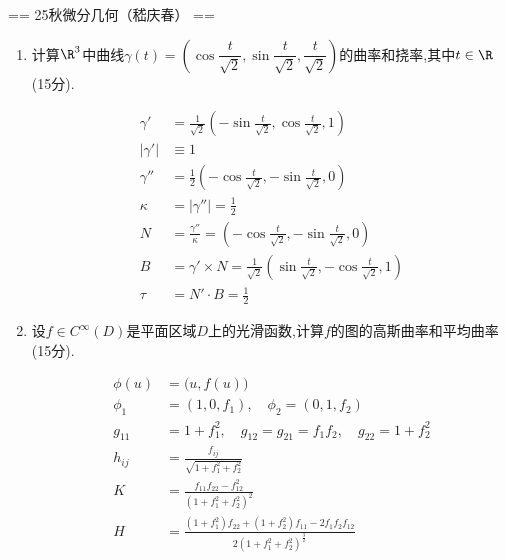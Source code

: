 \newcommand{\d}{\mathrm{d}}


== 25秋微分几何（嵇庆春） ==

	\begin{enumerate}
		\item 计算$\R^{3}$中曲线$\gamma(t)=\left(\cos\dfrac{t}{\sqrt{2}},\sin\dfrac{t}{\sqrt{2}},\dfrac{t}{\sqrt{2}}\right)$的曲率和挠率,其中$t\in\R$(15分).
        \begin{proofc}
            \begin{align*}
				\gamma'&=\frac{1}{\sqrt{2}}\left(-\sin\frac{t}{\sqrt{2}},\cos\frac{t}{\sqrt{2}},1\right)\\
				|\gamma'|&\equiv 1\\
				\gamma''&=\frac{1}{2}\left(-\cos\frac{t}{\sqrt{2}},-\sin\frac{t}{\sqrt{2}},0\right)\\
				\kappa&=|\gamma''|=\frac{1}{2}\\
				N&=\frac{\gamma''}{\kappa}=\left(-\cos\frac{t}{\sqrt{2}},-\sin\frac{t}{\sqrt{2}},0\right)\\
				B&=\gamma'\times N=\frac{1}{\sqrt{2}}\left(\sin\frac{t}{\sqrt{2}},-\cos\frac{t}{\sqrt{2}},1\right)\\
				\tau&=N'\cdot B=\frac{1}{2}
			\end{align*}
        \end{proofc}
		\item 设$f\in C^{\infty}(D)$是平面区域$D$上的光滑函数,计算$f$的图的高斯曲率和平均曲率(15分).
		\begin{proofc}
            \begin{align*}
				\phi(u)&=\bigl(u,f(u)\bigr)\\
				\phi_{1}&=(1,0,f_{1}),\quad\phi_{2}=(0,1,f_{2})\\
				g_{11}&=1+f_{1}^{2},\quad g_{12}=g_{21}=f_{1}f_{2},\quad g_{22}=1+f_{2}^{2}\\
				h_{ij}&=\frac{f_{ij}}{\sqrt{1+f_{1}^{2}+f_{2}^{2}}}\\
				K&=\frac{f_{11}f_{22}-f_{12}^{2}}{(1+f_{1}^{2}+f_{2}^{2})^{2}}\\
				H&=\frac{(1+f_{1}^{2})f_{22}+(1+f_{2}^{2})f_{11}-2f_{1}f_{2}f_{12}}{2(1+f_{1}^{2}+f_{2}^{2})^{\frac{3}{2}}}
			\end{align*}

\end{proofc}
\end{enumerate}
